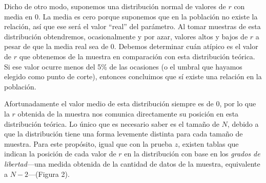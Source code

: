 \documentclass[a4paper,12pt]{article}
\begin{document}
Dicho de otro modo, suponemos una distribución normal de valores de $r$ con media en 0. La media es cero porque suponemos que en la población no existe la relación, así que ese será el valor ``real'' del parámetro. Al tomar muestras de esta distribución obtendremos, ocasionalmente y por azar, valores altos y bajos de $r$ a pesar de que la media real sea de 0. Debemos determinar cuán atípico es el valor de $r$ que obtenemos de la muestra en comparación con esta distribución teórica. Si ese valor ocurre menos del 5\% de las ocasiones (o el umbral que hayamos elegido como punto de corte), entonces concluimos que sí existe una relación en la población.

Afortunadamente el valor medio de esta distribución siempre es de 0, por lo que la $r$ obtenida de la muestra nos comunica directamente su posición en esta distribución teórica. Lo único que es necesario saber es el tamaño de $N$, debido a que la distribución tiene una forma levemente distinta para cada tamaño de muestra. Para este propósito, igual que con la prueba $z$, existen tablas que indican la posición de cada valor de $r$ en la distribución con base en los {\slshape grados de libertad}---una medida obtenida de la cantidad de datos de la muestra, equivalente a $N - 2$---(Figura 2).
\end{document}

